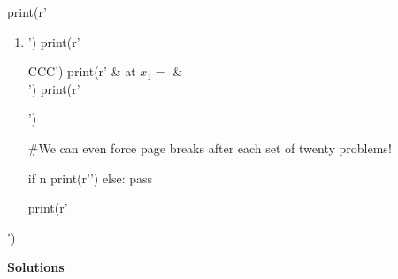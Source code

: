 \documentclass[ebook,12pt,oneside,openany]{memoir} %
\begin{document}

\clearpage
\setcounter{page}{1}



\vspace*{-.4in}


\vspace*{-.1in}



\begin{sympycode}

print(r'\begin{enumerate}')
print(r'\renewcommand\labelenumi{\bfseries\theenumi.}')
print(r'\setcounter{enumi}{0}')

for n in range(NumProb):
	print(r'\item ')
	print(r' \begin{tabular}{C{\OutColWidthMed}C{\OutColWidthMed}C{\OutColWidthSml}}')
	print(r' & at  $x_1=$ &  \\')
	print(r'\end{tabular}')


#We can even force page breaks after each set of twenty problems!

	if n %
		print(r'\newpage')
	else:
		pass

print(r'\end{enumerate}')

\end{sympycode}




\newpage











\clearpage
\setcounter{page}{1}
\pagestyle{fancy}


{\large \textbf{Solutions}}

\bigskip
\end{document}
